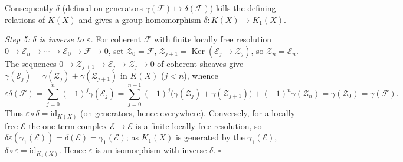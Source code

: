 \documentclass[11pt]{article}
\begin{document}
Consequently $\delta$ (defined on generators $\gamma(\mathcal F)\mapsto\delta(\mathcal F)$) kills the defining relations of $K(X)$ and gives a group homomorphism $\delta\colon K(X)\to K_1(X)$.

\emph{Step 5: $\delta$ is inverse to $\varepsilon$.} For coherent $\mathcal F$ with finite locally free resolution $0\to\mathcal E_n\to\cdots\to\mathcal E_0\to\mathcal F\to0$, set $\mathcal Z_0=\mathcal F$, $\mathcal Z_{j+1}=\operatorname{Ker}(\mathcal E_j\to\mathcal Z_j)$, so $\mathcal Z_n=\mathcal E_n$. The sequences $0\to\mathcal Z_{j+1}\to\mathcal E_j\to\mathcal Z_j\to0$ of coherent sheaves give $\gamma(\mathcal E_j)=\gamma(\mathcal Z_j)+\gamma(\mathcal Z_{j+1})$ in $K(X)$ ($j<n$), whence
\[
\varepsilon\delta(\mathcal F)=\sum_{j=0}^n(-1)^j\gamma(\mathcal E_j)=\sum_{j=0}^{n-1}(-1)^j\big(\gamma(\mathcal Z_j)+\gamma(\mathcal Z_{j+1})\big)+(-1)^n\gamma(\mathcal Z_n)=\gamma(\mathcal Z_0)=\gamma(\mathcal F).
\]
Thus $\varepsilon\circ\delta=\mathrm{id}_{K(X)}$ (on generators, hence everywhere). Conversely, for a locally free $\mathcal E$ the one-term complex $\mathcal E\to\mathcal E$ is a finite locally free resolution, so $\delta\varepsilon(\gamma_1(\mathcal E))=\delta(\mathcal E)=\gamma_1(\mathcal E)$; as $K_1(X)$ is generated by the $\gamma_1(\mathcal E)$, $\delta\circ\varepsilon=\mathrm{id}_{K_1(X)}$. Hence $\varepsilon$ is an isomorphism with inverse $\delta$. \hfill$\square$
\end{document}
